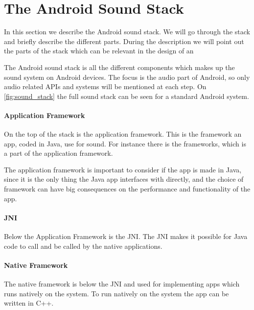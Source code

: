 \section{The Android Sound Stack}
In this section we describe the Android sound stack.
We will go through the stack and briefly describe the different parts.
During the description we will point out the parts of the stack which can be relevant in the design of an 

The Android sound stack is all the different components which makes up the sound system on Android devices.
The focus is the audio part of Android, so only audio related \acp{API} and systems will be mentioned at each step. 
On \cref{fig:sound_stack} the full sound stack can be seen for a standard Android system.

\paragraph{Application Framework}
On the top of the stack is the application framework.
This is the framework an app, coded in Java, use for sound.
For instance there is the  frameworks, which is a part of the application framework.

The application framework is important to consider if the app is made in Java,
since it is the only thing the Java app interfaces with directly, 
and the choice of framework can have big consequences on the performance and functionality of the app.%

\paragraph{JNI}
Below the Application Framework is the \ac{JNI}.
The \ac{JNI} makes it possible for Java code to call and be called by the native applications\cite{jni}.

\paragraph{Native Framework}
The native framework is below the \ac{JNI} and used for implementing apps which runs natively on the system.
To run natively on the system the app can be written in C++.

